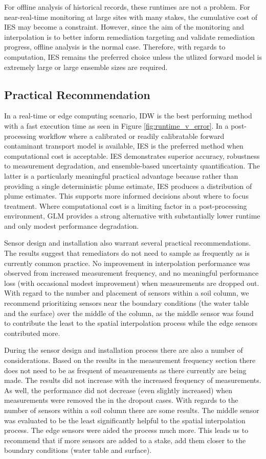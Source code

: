 For offline analysis of historical records, these runtimes are not a problem. For near-real-time monitoring at large sites with many stakes, the cumulative cost of IES may become a constraint. However, since the aim of the monitoring and interpolation is to better inform remediation targeting and validate remediation progress, offline analysis is the normal case. Therefore, with regards to computation, IES remains the preferred choice unless the utlized forward model is extremely large or large ensemble sizes are required.

\subsection{Practical Recommendation}

In a real-time or edge computing scenario, IDW is the best performing method with a fast execution time as seen in Figure \ref{fig:runtime_v_error}. In a post-processing workflow where a calibrated or readily calibratable forward contaminant transport model is available, IES is the preferred method when computational cost is acceptable. IES demonstrates superior accuracy, robustness to measurement degradation, and ensemble-based uncertainty quantification. The latter is a particularly meaningful practical advantage because rather than providing a single deterministic plume estimate, IES produces a distribution of plume estimates. This supports more informed decisions about where to focus treatment. Where computational cost is a limiting factor in a post-processing environment, GLM provides a strong alternative with substantially lower runtime and only modest performance degradation. 

Sensor design and installation also warrant several practical recommendations. The results suggest that remediators do not need to sample as frequently as is currently common practice. No improvement in interpolation performance was observed from increased measurement frequency, and no meaningful performance loss (with occasional modest improvement) when measurements are dropped out. With regard to the number and placement of sensors within a soil column, we recommend prioritizing sensors near the boundary conditions (the water table and the surface) over the middle of the column, as the middle sensor was found to contribute the least to the spatial interpolation process while the edge sensors contributed more.

During the sensor design and installation process there are also a number of considerations. Based on the results in the measurement frequency section there does not need to be as frequent of measurements as there currently are being made. The results did not increase with the increased frequency of measurements. As well, the performance did not decrease (even slightly increased) when measurements were removed the in the dropout cases. With regards to the number of sensors within a soil column there are some results. The middle sensor was evaluated to be the least significantly helpful to the spatial interpolation process. The edge sensors were aided the process much more. This leads us to recommend that if more sensors are added to a stake, add them closer to the boundary conditions (water table and surface). 

